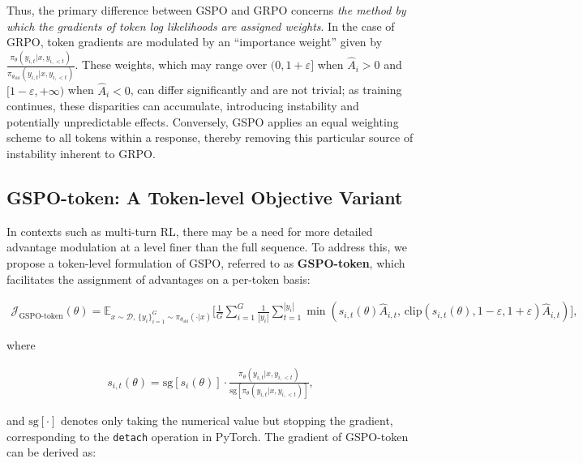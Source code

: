 Thus, the primary difference between GSPO and GRPO concerns \textit{the method by which the gradients of token log likelihoods are assigned weights}. In the case of GRPO, token gradients are modulated by an ``importance weight'' given by $\frac{ \pi_{\theta} (y_{i,t} | x, y_{i,<t}) }{ \pi_{\theta_\text{old}} (y_{i,t} | x,y_{i,<t})}$. These weights, which may range over $(0, 1+\varepsilon]$ when $\widehat{A}_{i} > 0$ and $[1-\varepsilon, +\infty)$ when $\widehat{A}_{i} < 0$, can differ significantly and are not trivial; as training continues, these disparities can accumulate, introducing instability and potentially unpredictable effects. Conversely, GSPO applies an equal weighting scheme to all tokens within a response, thereby removing this particular source of instability inherent to GRPO.

\subsection{GSPO-token: A Token-level Objective Variant}

In contexts such as multi-turn RL, there may be a need for more detailed advantage modulation at a level finer than the full sequence. To address this, we propose a token-level formulation of GSPO, referred to as \textbf{GSPO-token}, which facilitates the assignment of advantages on a per-token basis:

\begin{align}
\mathcal{J}_\text{GSPO-token}(\theta)
=
\mathbb{E}_{ x \sim \mathcal{D},\, \{y_i\}_{i=1}^G \sim \pi_{\theta_\text{old}}( \cdot | x) }
\bigg[
\frac{1}{G} \sum_{i=1}^{G} \frac{1}{|y_i|} \sum_{t=1}^{|y_i|} 
\min \left( s_{i,t}(\theta) \widehat{A}_{i,t},  \, \mathrm{clip} \left( s_{i,t}(\theta), 1 - {\varepsilon}, 1 + {\varepsilon} \right) \widehat{A}_{i,t} \right) 
\bigg],
\label{equ:gspo-token}
\end{align}

where

\begin{align}
s_{i,t}(\theta) 
= \mathrm{sg} \left[ s_{i}(\theta) \right]  \cdot \frac{ \pi_{\theta} (y_{i,t} | x, y_{i,<t}) }{ \mathrm{sg} \left[ \pi_{\theta} (y_{i,t} | x, y_{i,<t}) \right] },
\end{align}

and $\mathrm{sg}[\cdot]$ denotes only taking the numerical value but stopping the gradient, corresponding to the \texttt{detach} operation in PyTorch. The gradient of GSPO-token can be derived as:


